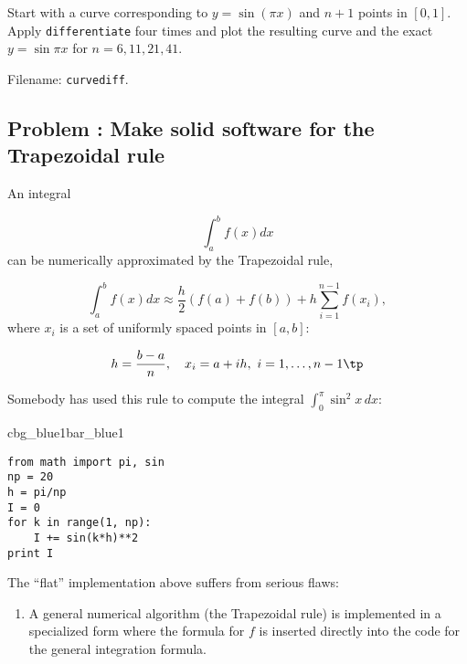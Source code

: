 \documentclass[graybox,sectrefs,envcountresetchap,open=right,final]{svmonodo}
\newenvironment{_pro_tight}[2]{
   \def\FrameCommand{\color{#2}\vrule width 1mm\normalcolor\colorbox{#1}}
   \FrameRule0.6pt\MakeFramed {\advance\hsize-2mm\FrameRestore}\vskip3mm}
   {\vskip0mm\endMakeFramed}
\newenvironment{pro}[2]{
\bgroup\rmfamily
\fboxsep=0mm\relax
\begin{_pro_tight}{#1}{#2}
\list{}{\parsep=-2mm\parskip=0mm\topsep=0pt\leftmargin=2mm
\rightmargin=2\leftmargin\leftmargin=4pt\relax}
\item\relax}
{\endlist\end{_pro_tight}\egroup}
\newenvironment{doconceexercise}{}{}
\newcounter{doconceexercisecounter}
\begin{document}
\begin{doconceexercise}
\noindent
{}
Start with a curve corresponding to $y=\sin(\pi x)$ and $n+1$
points in $[0,1]$. Apply \texttt{differentiate} four times and plot the
resulting curve and the exact $y=\sin\pi x$ for $n=6, 11, 21, 41$.



\noindent Filename: \texttt{curvediff}.

\end{doconceexercise}




\begin{doconceexercise}

\subsection*{Problem \thedoconceexercisecounter: Make solid software for the Trapezoidal rule}

\label{softeng1:exer:integral:flat}

An integral

\[ \int_a^b f(x)dx \]
can be numerically approximated by the Trapezoidal rule,

\[ \int_a^b f(x)dx \approx \frac{h}{2}(f(a) + f(b)) + h\sum_{i=1}^{n-1} f(x_i),
\]
where $x_i$ is a set of uniformly spaced points in $[a,b]$:

\[ h = \frac{b-a}{n},\quad x_i=a + ih,\ i=1,\ldots,n-1\tp \]

Somebody has used this rule to compute the integral $\int_0^\pi \sin^2x\, dx$:

\begin{pro}{cbg_blue1}{bar_blue1}\begin{Verbatim}[numbers=none,fontsize=\fontsize{9pt}{9pt},baselinestretch=0.95,xleftmargin=2mm]
from math import pi, sin
np = 20
h = pi/np
I = 0
for k in range(1, np):
    I += sin(k*h)**2
print I
\end{Verbatim}
\end{pro}
\noindent


The ``flat'' implementation above suffers from serious flaws:

\begin{enumerate}
\item A general numerical algorithm (the Trapezoidal rule) is implemented
   in a specialized form where the formula for $f$ is inserted directly
   into the code for the general integration formula.


\end{enumerate}
\end{doconceexercise}
\end{document}
